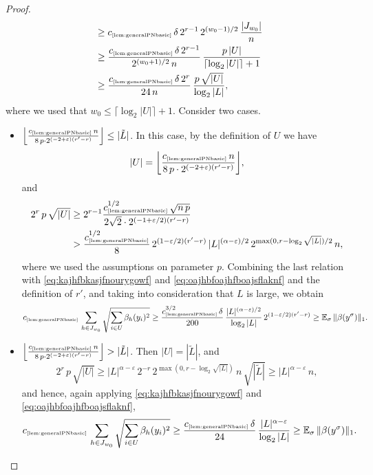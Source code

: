 \documentclass[11pt]{amsart}
\theoremstyle{definition}
\theoremstyle{plain}
\def\Exp{{\mathbb E}}
\begin{document}
\begin{proof}
\begin{align}
&\geq
c_{\text{\tiny\ref{lem:generalPNbasic}}}\,\delta\,2^{r-1}\,
2^{(w_0-1)/2}\,
\frac{|J_{w_0}|}{n}\nonumber\\
&\geq \frac{c_{\text{\tiny\ref{lem:generalPNbasic}}}\,\delta\,2^{r-1}}{2^{(w_0+1)/2}\,n}\,\frac{p\,|U|}{\lceil\log_2|U|\rceil+1}\nonumber\\
&\geq 
\frac{c_{\text{\tiny\ref{lem:generalPNbasic}}}\,\delta\,2^{r}}{24\,n}\,\frac{p\,\sqrt{|U|}}{\log_2|L|}\label{eq:kajhfbkasjfnourygowf},
\end{align}
where we used that $w_0\leq\lceil\log_2|U|\rceil+1$.
Consider two cases. 
\begin{itemize}
\item 
$\Big\lfloor 
\frac{c_{\text{\tiny\ref{lem:generalPNbasic}}}\,n}
{8\,p\cdot 2^{(-2+\varepsilon)(r'-r)}}\Big\rfloor\leq |\tilde L|$.
In this case, by the definition of $U$ we have
$$|U|=\bigg\lfloor 
\frac{c_{\text{\tiny\ref{lem:generalPNbasic}}}\,n}
{8\,p\cdot 2^{(-2+\varepsilon)(r'-r)}}\bigg\rfloor,$$
and
\begin{align*}
2^{r}\,p\,\sqrt{|U|}
&\geq 2^{r-1}
\frac{c_{\text{\tiny\ref{lem:generalPNbasic}}}^{1/2}\,\sqrt{n\,p}}
{2\sqrt{2}\cdot 2^{(-1+\varepsilon/2)(r'-r)}}\\
&>
\frac{c_{\text{\tiny\ref{lem:generalPNbasic}}}^{1/2}}{8}
\,2^{(1-\varepsilon/2)(r'-r)}\,
|L|^{(\alpha-\varepsilon)/2}\,
2^{\max(0,r-\log_2\sqrt{|L|})/2}\,n,
\end{align*}
where we used the assumptions on parameter $p$.
Combining the last relation with \eqref{eq:kajhfbkasjfnourygowf}
and \eqref{eq:oajhbfoajhfboajsflaknf}
and the definition of $r'$, and taking into consideration that
$L$ is large,
we obtain
\begin{equation}\label{eq:ljahboafhbpigjnlkjn}
c_{\text{\tiny\ref{lem:generalPNbasic}}}\,
\sum_{h\in J_{w_0}}\sqrt{\sum_{i\in U}\beta_h(y_i)^2}
\geq 
\frac{c_{\text{\tiny\ref{lem:generalPNbasic}}}^{3/2}\,\delta}
{200}\,\frac{|L|^{(\alpha-\varepsilon)/2}}{\log_2|L|}
\,2^{(1-\varepsilon/2)(r'-r)}
\geq 
\Exp_{\sigma}\,\|\beta(y^\sigma)\|_1.    
\end{equation}


\item $\Big\lfloor 
\frac{c_{\text{\tiny\ref{lem:generalPNbasic}}}\,n}
{8\,p\cdot 2^{(-2+\varepsilon)(r'-r)}}\Big\rfloor> |\tilde L|$.
Then $|U|=|\tilde L|$, and
$$
2^{r}\,p\,\sqrt{|U|}
\geq
|L|^{\alpha-\varepsilon}\,2^{-r}\,
2^{\max(0,r-\log_2\sqrt{|L|})}\,n\,\sqrt{|\tilde L|}
\geq |L|^{\alpha-\varepsilon}\,n,
$$
and hence, again applying \eqref{eq:kajhfbkasjfnourygowf}
and \eqref{eq:oajhbfoajhfboajsflaknf},
\begin{equation}\label{eq:aljhbfkgjnpjnfkjnlaksjn}
c_{\text{\tiny\ref{lem:generalPNbasic}}}\,
\sum_{h\in J_{w_0}}\sqrt{\sum_{i\in U}\beta_h(y_i)^2}
\geq 
\frac{c_{\text{\tiny\ref{lem:generalPNbasic}}}\,\delta}{24}\,\frac{|L|^{\alpha-\varepsilon}}{\log_2|L|}
\geq \Exp_{\sigma}\,\|\beta(y^\sigma)\|_1.
\end{equation}


\end{itemize}
\end{proof}
\end{document}

